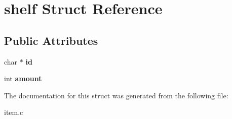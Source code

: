 \hypertarget{structshelf}{}\section{shelf Struct Reference}
\label{structshelf}
\subsection*{Public Attributes}
\begin{DoxyCompactItemize}
\item 
char $\ast$ {\bfseries id}\hypertarget{structshelf_a7f8287189403254107701949e95c307a}{}\label{structshelf_a7f8287189403254107701949e95c307a}

\item 
int {\bfseries amount}\hypertarget{structshelf_a6a1b09835f421eb1aa0d752411484733}{}\label{structshelf_a6a1b09835f421eb1aa0d752411484733}

\end{DoxyCompactItemize}


The documentation for this struct was generated from the following file\+:\begin{DoxyCompactItemize}
\item 
item.\+c\end{DoxyCompactItemize}
